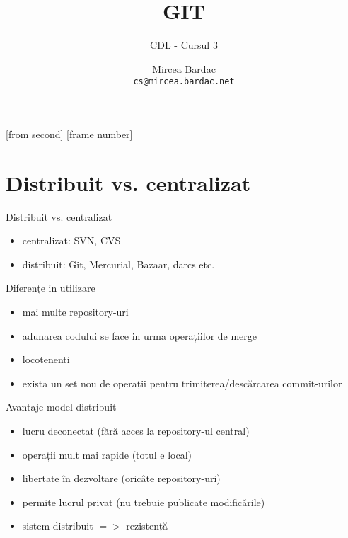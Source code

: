 \documentclass{beamer}
\title[GIT]{GIT}
\subtitle{CDL - Cursul 3}
\institute{ROSEdu}
\author{Mircea Bardac \\ \texttt{cs@mircea.bardac.net}}
\begin{document}
[from second]
[frame number]

\frame{\titlepage}

\frame{\tableofcontents}

\section{Distribuit vs. centralizat}

\frame{\tableofcontents[currentsection]}

\begin{frame}{Distribuit vs. centralizat}
\begin{itemize} %
\item centralizat: SVN, CVS
\item distribuit: Git, Mercurial, Bazaar, darcs etc.
\end{itemize}
\end{frame}

\begin{frame}{Diferențe in utilizare}
\begin{itemize} %
\item mai multe repository-uri
\item adunarea codului se face in urma operațiilor de merge
\item locotenenti
\item exista un set nou de operații pentru trimiterea/descărcarea commit-urilor
\end{itemize}
\end{frame}



\begin{frame}{Avantaje model distribuit}
\begin{itemize} %
\item lucru deconectat (fără acces la repository-ul central)
\item operații mult mai rapide (totul e local)
\item libertate în dezvoltare (oricâte repository-uri)
\item permite lucrul privat (nu trebuie publicate modificările)
\item sistem distribuit $=>$ rezistență
\end{itemize}
\end{frame}
\end{document}
